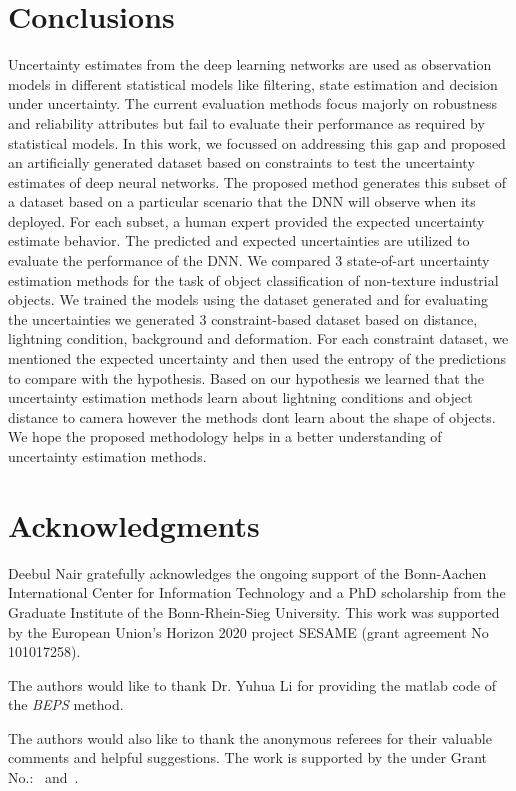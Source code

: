 \hypertarget{conclusions}{%
\section{Conclusions}\label{conclusions}}
Uncertainty estimates from the deep learning networks are used as observation models in different statistical models like filtering, state estimation and decision under uncertainty. The current evaluation methods focus majorly on robustness and reliability attributes but fail to evaluate their performance as required by statistical models. In this work, we focussed on addressing this gap and proposed an artificially generated dataset based on constraints to test the uncertainty estimates of deep neural networks.
The proposed method generates this subset of a dataset based on a particular scenario that the DNN will observe when its deployed. For each subset, a human expert  provided the expected uncertainty estimate behavior.  The predicted and expected uncertainties are utilized to evaluate the performance of the DNN.
We compared 3 state-of-art uncertainty estimation methods for the task of object classification of non-texture industrial objects. We trained the models using the dataset generated and for evaluating the uncertainties we generated 3 constraint-based dataset based on distance, lightning condition, background and deformation. 
For each constraint dataset, we mentioned the expected uncertainty and then used the entropy of the predictions to compare with the hypothesis.
Based on our hypothesis we learned that the uncertainty estimation methods learn about lightning conditions and object distance to camera however the methods dont learn about the shape of objects.
We hope the proposed methodology helps in a better understanding of uncertainty estimation methods.


\section{Acknowledgments}
Deebul Nair gratefully acknowledges the ongoing support
of the Bonn-Aachen International Center for Information Technology and a PhD
scholarship from the Graduate Institute of the Bonn-Rhein-Sieg University. This
work was supported by the European Union’s Horizon 2020 project SESAME (grant agreement No 101017258).


\begin{acks}
  The authors would like to thank Dr. Yuhua Li for providing the
  matlab code of  the \textit{BEPS} method. 

  The authors would also like to thank the anonymous referees for
  their valuable comments and helpful suggestions. The work is
  supported by the  under Grant
  No.:~
  and~.

\end{acks}
